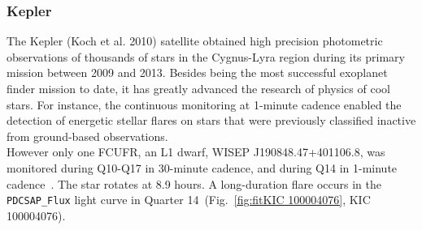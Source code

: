 \documentclass[fleqn,usenatbib,letters]{mnras}%
\newcommand{\FE}{KIC 100004076} %
\begin{document}
\subsubsection{Kepler}
\label{sec:photometryKepler}
The Kepler (Koch et al. 2010) satellite obtained high precision photometric observations of thousands of stars in the Cygnus-Lyra region during its primary mission between 2009 and 2013. Besides being the most successful exoplanet finder mission to date, it has greatly advanced the research of physics of cool stars. For instance, the continuous monitoring at 1-minute cadence enabled the detection of energetic stellar flares on stars that were previously classified inactive from ground-based observations.
\\
However
only one FCUFR, an L1 dwarf, WISEP J190848.47+401106.8, was monitored during Q10-Q17 in 30-minute cadence, and during Q14 in 1-minute cadence~\citep{gizis2013}. The star rotates at 8.9 hours.
A long-duration flare occurs in the \texttt{PDCSAP\_Flux} light curve in Quarter 14~(Fig.~\ref{fig:fit\FE}, \FE).
\end{document}

